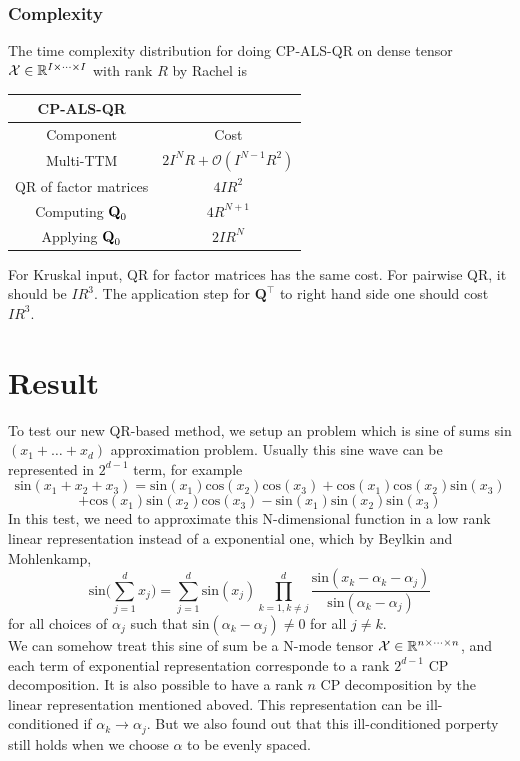 \documentclass{article}
\newcommand{\mat}[1]{\mathbf{#1}}
\newcommand{\M}[2][]{\bm{#1{\mathbf{\MakeUppercase{#2}}}}} 		%
\newcommand{\T}[2][]{#1{\mathbf{\cal{#2}}}} 						%
\begin{document}
\subsubsection*{Complexity}
The time complexity distribution for doing CP-ALS-QR on dense tensor $\T{X} \in \mathbb{R}^{I \times \dots \times I}$ with rank $R$ by Rachel is 
\begin{table}[!ht]
  \centering
  \begin{tabular}{|c|c|}
    \hline
    {\textbf{CP-ALS-QR}} & \\
    \hline
    Component & Cost \\
    \hline
    Multi-TTM & $2I^N R + \mathcal{O}(I^{N-1} R^2)$\\
    QR of factor matrices & $4IR^2$\\
     Computing $\M{Q}_0$ & $4R^{N+1}$\\
     Applying $\M{Q}_0$& $2IR^N$\\
     \hline
  \end{tabular}
  \end{table}
  For Kruskal input, QR for factor matrices has the same cost. For pairwise QR, it should be $IR^3$. The application step
  for $\mat{Q}^\top$ to right hand side one should cost $IR^3$.
  




\section*{Result}
To test our new QR-based method, we setup an problem which is sine of sums sin$(x_1+\dots+ x_d)$ approximation problem.
Usually this sine wave can be represented in $2^{d-1}$ term, for example
$$\text{sin}(x_1+x_2+x_3) = \text{sin}(x_1)\text{cos}(x_2)\text{cos}(x_3)+\text{cos}(x_1)\text{cos}(x_2)\text{sin}(x_3)$$
$$+\text{cos}(x_1)\text{sin}(x_2)\text{cos}(x_3) - \text{sin}(x_1)\text{sin}(x_2)\text{sin}(x_3)$$
In this test, we need to approximate this N-dimensional function in a low rank linear representation instead of 
a exponential one, which by Beylkin and Mohlenkamp,
$$\text{sin}\bigl(\sum^d_{j=1}x_j\bigr) = \sum^d_{j=1}\text{sin}(x_j)\prod^d_{k=1,k\neq j}\frac{\text{sin}(x_k - \alpha_k -\alpha_j)}{\text{sin}(\alpha_k - \alpha_j)}$$
for all choices of  ${\alpha_j}$ such that $\text{sin}(\alpha_k - \alpha_j) \neq 0$ for all $j \neq k$.
\\
We can somehow treat this sine of sum be a N-mode tensor $\T{X} \in \mathbb{R}^{n \times \dots \times n}$, and each term of exponential representation
corresponde to a rank $2^{d-1}$ CP decomposition. It is also possible to have a rank $n$ CP decomposition by the linear
representation mentioned aboved. This representation can be ill-conditioned if $\alpha_k \rightarrow \alpha_j$.
But we also found out that this ill-conditioned porperty still holds when we choose $\alpha$ to be evenly spaced.\\
\end{document}
